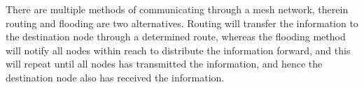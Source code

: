 
There are multiple methods of communicating through a mesh network, therein routing and flooding are two alternatives. Routing will transfer the information to the destination node through a determined route, whereas the flooding method will notify all nodes within reach to distribute the information forward, and this will repeat until all nodes has transmitted the information, and hence the destination node also has received the information.

